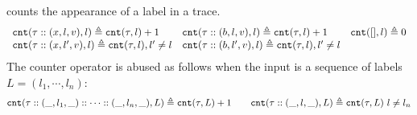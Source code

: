 counts the appearance of a label in a trace.
\[
\begin{array}{lll}
\mathtt{cnt}(\mathtt{\tau} :: (x, l, v), l ) \triangleq \mathtt{cnt}(\mathtt{\tau}, l) + 1
&
\mathtt{cnt}(\mathtt{\tau}  ::(b, l, v), l) \triangleq \mathtt{cnt}(\mathtt{\tau}, l) + 1
&
\mathtt{cnt}({[]}, l) \triangleq 0
\\
\mathtt{cnt}(\mathtt{\tau}  :: (x, l', v), l) \triangleq \mathtt{cnt}(\mathtt{\tau}, l), l' \neq l
&
\mathtt{cnt}(\mathtt{\tau}  :: (b, l', v), l) \triangleq \mathtt{cnt}(\mathtt{\tau}, l), l' \neq l
\end{array}
\]
The counter operator is abused as follows when the input is a sequence of labels $L = (l_1, \cdots, l_n)$:
\[
  \mathtt{cnt}(\mathtt{\tau} :: (\_, l_1, \_) :: \cdots :: (\_, l_n, \_), L ) 
  \triangleq \mathtt{cnt}(\mathtt{\tau}, L) + 1
  \qquad 
  \mathtt{cnt}(\mathtt{\tau} :: (\_, l, \_), L ) 
  \triangleq \mathtt{cnt}(\mathtt{\tau}, L) ~ l \neq l_n
  \]
%
%

